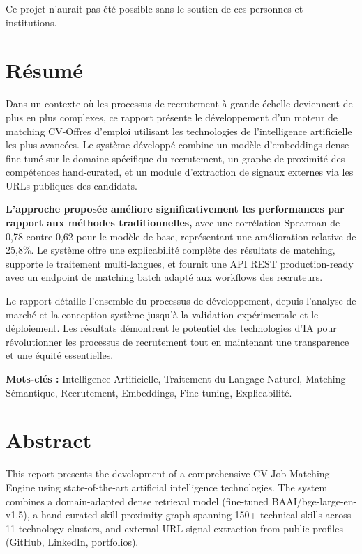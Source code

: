 \documentclass[12pt,a4paper]{report}
\begin{document}
Ce projet n'aurait pas été possible sans le soutien de ces personnes et institutions.

\chapter{Résumé}
\label{chap:resume}

Dans un contexte où les processus de recrutement à grande échelle deviennent de plus en plus complexes, ce rapport présente le développement d'un moteur de matching CV-Offres d'emploi utilisant les technologies de l'intelligence artificielle les plus avancées. Le système développé combine un modèle d'embeddings dense fine-tuné sur le domaine spécifique du recrutement, un graphe de proximité des compétences hand-curated, et un module d'extraction de signaux externes via les URLs publiques des candidats.

{\color{primarygreen}\large\textbf{L'approche proposée améliore significativement les performances par rapport aux méthodes traditionnelles,}} avec une corrélation Spearman de 0,78 contre 0,62 pour le modèle de base, représentant une amélioration relative de 25,8\%. Le système offre une explicabilité complète des résultats de matching, supporte le traitement multi-langues, et fournit une API REST production-ready avec un endpoint de matching batch adapté aux workflows des recruteurs.

Le rapport détaille l'ensemble du processus de développement, depuis l'analyse de marché et la conception système jusqu'à la validation expérimentale et le déploiement. Les résultats démontrent le potentiel des technologies d'IA pour révolutionner les processus de recrutement tout en maintenant une transparence et une équité essentielles.

{\color{darkgreen}\large\textbf{Mots-clés :}} Intelligence Artificielle, Traitement du Langage Naturel, Matching Sémantique, Recrutement, Embeddings, Fine-tuning, Explicabilité.

\chapter{Abstract}
\label{chap:abstract}

This report presents the development of a comprehensive CV-Job Matching Engine using state-of-the-art artificial intelligence technologies. The system combines a domain-adapted dense retrieval model (fine-tuned BAAI/bge-large-en-v1.5), a hand-curated skill proximity graph spanning 150+ technical skills across 11 technology clusters, and external URL signal extraction from public profiles (GitHub, LinkedIn, portfolios).
\end{document}
